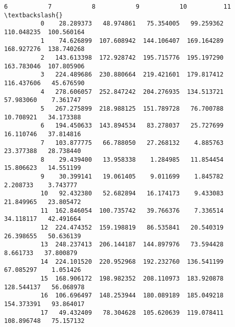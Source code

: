 \documentclass[11pt]{article}
\begin{document}
\begin{Verbatim}[commandchars=\\\{\}]
                      6           7           8           9           10          11  \textbackslash{}
          0    28.289373   48.974861   75.354005   99.259362  110.048235  100.560164   
          1    74.626899  107.608942  144.106407  169.164289  168.927276  138.740268   
          2   143.613398  172.928742  195.715776  195.197290  163.783046  107.805906   
          3   224.489686  230.880664  219.421601  179.817412  116.437606   45.676590   
          4   278.606057  252.847242  204.276935  134.513721   57.983060    7.361747   
          5   267.275899  218.988125  151.789728   76.700788   10.708921   34.173388   
          6   194.450633  143.894534   83.278037   25.727699   16.110746   37.814816   
          7   103.877775   66.788050   27.268132    4.885763   23.377388   28.738440   
          8    29.439400   13.958338    1.284985   11.854454   15.806623   14.551199   
          9    30.399141   19.061405    9.011699    1.845782    2.208733    3.743777   
          10   92.432380   52.682894   16.174173    9.433083   21.849965   23.805472   
          11  162.846054  100.735742   39.766376    7.336514   34.118117   42.491664   
          12  224.474352  159.198819   86.535841   20.540319   26.398655   50.636139   
          13  248.237413  206.144187  144.897976   73.594428    8.661733   37.800879   
          14  224.101520  220.952968  192.232760  136.541199   67.085297    1.051426   
          15  168.906172  198.982352  208.110973  183.920878  128.544137   56.068978   
          16  106.696497  148.253944  180.089189  185.049218  154.373391   93.864017   
          17   49.432409   78.304628  105.620639  119.078411  108.896748   75.157132   
          

\end{Verbatim}
\end{document}
